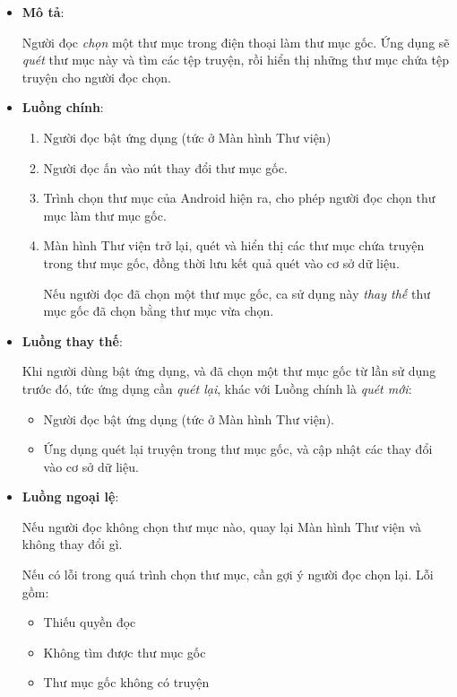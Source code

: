 \documentclass[
]{article}
\begin{document}
\begin{itemize}
\item
  \textbf{Mô tả}:

  Người đọc \emph{chọn} một thư mục trong điện thoại làm thư mục gốc.
  Ứng dụng sẽ \emph{quét} thư mục này và tìm các tệp truyện, rồi hiển
  thị những thư mục chứa tệp truyện cho người đọc chọn.
\item
  \textbf{Luồng chính}:

  \begin{enumerate}
  \def\labelenumi{\arabic{enumi}.}
  \item
    Người đọc bật ứng dụng (tức ở Màn hình Thư viện)
  \item
    Người đọc ấn vào nút thay đổi thư mục gốc.
  \item
    Trình chọn thư mục của Android hiện ra, cho phép người đọc chọn thư
    mục làm thư mục gốc.
  \item
    Màn hình Thư viện trở lại, quét và hiển thị các thư mục chứa truyện
    trong thư mục gốc, đồng thời lưu kết quả quét vào cơ sở dữ liệu.

    Nếu người đọc đã chọn một thư mục gốc, ca sử dụng này \emph{thay
    thế} thư mục gốc đã chọn bằng thư mục vừa chọn.
  \end{enumerate}
\item
  \textbf{Luồng thay thế}:

  Khi người dùng bật ứng dụng, và đã chọn một thư mục gốc từ lần sử dụng
  trước đó, tức ứng dụng cần \emph{quét lại}, khác với Luồng chính là
  \emph{quét mới}:

  \begin{itemize}
    \item
    Người đọc bật ứng dụng (tức ở Màn hình Thư viện).
  \item
    Ứng dụng quét lại truyện trong thư mục gốc, và cập nhật các thay đổi
    vào cơ sở dữ liệu.
  \end{itemize}
\item
  \textbf{Luồng ngoại lệ}:

  Nếu người đọc không chọn thư mục nào, quay lại Màn hình Thư viện và
  không thay đổi gì.

  Nếu có lỗi trong quá trình chọn thư mục, cần gợi ý người đọc chọn lại.
  Lỗi gồm:

  \begin{itemize}
    \item
    Thiếu quyền đọc
  \item
    Không tìm được thư mục gốc
  \item
    Thư mục gốc không có truyện
  \end{itemize}


\end{itemize}
\end{document}
